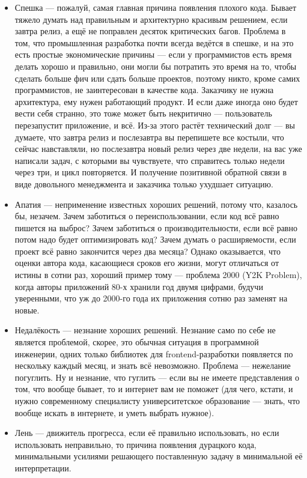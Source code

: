 \documentclass{../../text-style}
\begin{document}
\begin{itemize}
    \item Спешка --- пожалуй, самая главная причина появления плохого кода. Бывает тяжело думать над правильным и архитектурно красивым решением, если завтра релиз, а ещё не поправлен десяток критических багов. Проблема в том, что промышленная разработка почти всегда ведётся в спешке, и на это есть простые экономические причины --- если у программистов есть время делать хорошо и правильно, они могли бы потратить это время на то, чтобы сделать больше фич или сдать больше проектов, поэтому никто, кроме самих программистов, не заинтересован в качестве кода. Заказчику не нужна архитектура, ему нужен работающий продукт. И если даже иногда оно будет вести себя странно, это тоже может быть некритично --- пользователь перезапустит приложение, и всё. Из-за этого растёт технический долг --- вы думаете, что завтра релиз и послезавтра вы перепишете все костыли, что сейчас навставляли, но послезавтра новый релиз через две недели, на вас уже написали задач, с которыми вы чувствуете, что справитесь только недели через три, и цикл повторяется. И получение позитивной обратной связи в виде довольного менеджмента и заказчика только ухудшает ситуацию.
    \item Апатия --- неприменение известных хороших решений, потому что, казалось бы, незачем. Зачем заботиться о переиспользовании, если код всё равно пишется на выброс? Зачем заботиться о производительности, если всё равно потом надо будет оптимизировать код? Зачем думать о расширяемости, если проект всё равно закончится через два месяца? Однако оказывается, что оценки автора кода, касающиеся сроков его жизни, могут отличаться от истины в сотни раз, хороший пример тому --- проблема 2000 (Y2K Problem), когда авторы приложений 80-х хранили год двумя цифрами, будучи уверенными, что уж до 2000-го года их приложения сотню раз заменят на новые.
    \item Недалёкость --- незнание хороших решений. Незнание само по себе не является проблемой, скорее, это обычная ситуация в программной инженерии, одних только библиотек для frontend-разработки появляется по нескольку каждый месяц, и знать всё невозможно. Проблема --- нежелание погуглить. Ну и незнание, что гуглить --- если вы не имеете представления о том, что вообще бывает, то и интернет вам не поможет (для чего, кстати, и нужно современному специалисту университетское образование --- знать, что вообще искать в интернете, и уметь выбрать нужное).
    \item Лень --- движитель прогресса, если её правильно использовать, но если использовать неправильно, то причина появления дурацкого кода, минимальными усилиями решающего поставленную задачу в минимальной её интерпретации.

\end{itemize}
\end{document}
